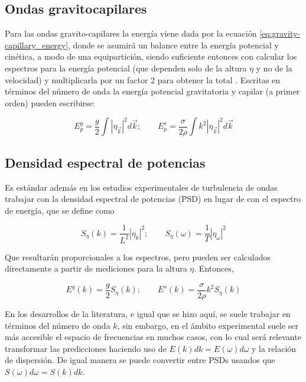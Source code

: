 \subsection{Ondas gravitocapilares}  %
Para las ondas gravito-capilares la energía viene dada por la ecuación \eqref{eq:gravity-capillary_energy}, donde se asumirá un balance entre la energía potencial y cinética, a modo de una equipartición, siendo suficiente entonces con calcular los espectros para la energía potencial (que dependen solo de la altura $\eta$ y no de la velocidad) y multiplicarla por un factor 2 para obtener la total \cite{kunduFluidMechanics2014, deikeEtudesExperimentalesNumeriques2013}.  Escritas en términos del número de onda la energía potencial gravitatoria y capilar (a primer orden) pueden escribirse:  

\begin{equation}
	E_p^g = \frac{g}{2} \int|\eta_{\vec k}|^2d\vec k; \qquad E_p^s=\frac{\sigma}{2\rho }\int k^2|\eta_{\vec k}|^2 d\vec k 
	\label{eq:potential_energies}
\end{equation} 




\subsection{Densidad espectral de potencias} 
Es estándar además en los estudios experimentales de turbulencia de ondas trabajar con la densidad espectral de potencias (PSD) en lugar de con el espectro de energía, que se define como 

\begin{equation}
	S_{\eta}(k)=\frac{1}{L^2}|\eta_{k}|^2;\qquad S_\eta(\omega)=\frac{1}{T}|\eta_{\omega}|^2
\end{equation} 

Que resultarán proporcionales a los espectros, pero pueden ser calculados directamente a partir de mediciones para la altura $\eta$. Entonces, 

\begin{equation}
	E^g(k) = \frac{g}{2} S_\eta(k); \qquad E^s(k) = \frac{\sigma}{2\rho }k^2S_\eta(k) 
\end{equation}

En los desarrollos de la literatura, e igual que se hizo aquí, se suele trabajar en términos del número de onda $k$, sin embargo, en el ámbito experimental suele ser más accesible el espacio de frecuencias en muchos casos, con lo cual será relevante transformar las predicciones haciendo uso de $E(k)dk=E(\omega)d\omega$ y la relación de dispersión. De igual manera se puede convertir entre PSDs usandos que $S(\omega)d\omega=S(k)dk$.  %



